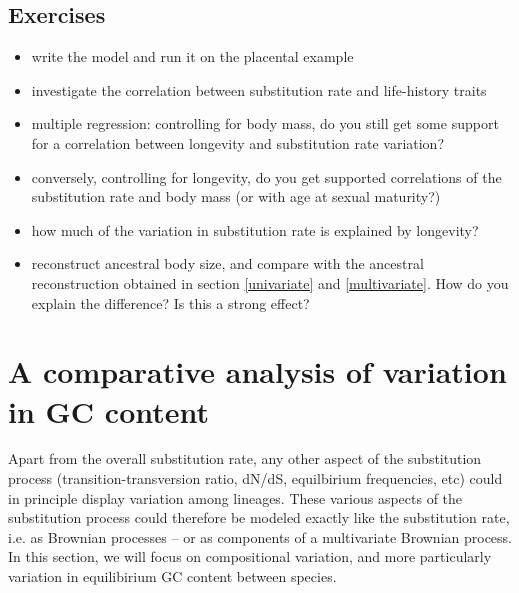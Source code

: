 \documentclass[usletter]{article}
\begin{document}
\subsection*{Exercises}

\begin{itemize}
\item
write the model and run it on the placental example
\item
investigate the correlation between substitution rate and life-history traits
\item
multiple regression: controlling for body mass, do you still get some support for a correlation between longevity and substitution rate variation?
\item
conversely, controlling for longevity, do you get supported correlations of the substitution rate and body mass (or with age at sexual maturity?)
\item
how much of the variation in substitution rate is explained by longevity?
\item
reconstruct ancestral body size, and compare with the ancestral reconstruction obtained in section \ref{univariate} and \ref{multivariate}. How do you explain the difference? Is this a strong effect?
\end{itemize}

\section{A comparative analysis of variation in GC content}

Apart from the overall substitution rate, any other aspect of the substitution process (transition-transversion ratio, dN/dS, equilbirium frequencies, etc) could in principle display variation among lineages. These various aspects of the substitution  process could therefore be modeled exactly like the substitution rate, i.e. as Brownian processes -- or as components of a multivariate Brownian process.
In this section, we will focus on compositional variation, and more particularly variation in equilibirium GC content between species.
\end{document}
